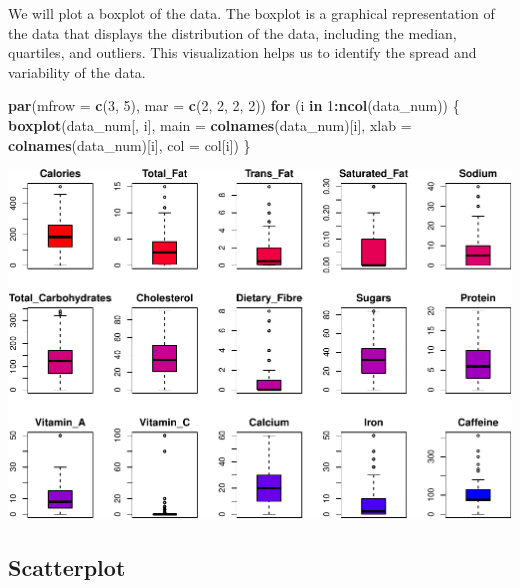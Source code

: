 \documentclass[
]{article}
\newenvironment{Shaded}{\begin{snugshade}}{\end{snugshade}}
\newcommand{\AttributeTok}[1]{\textcolor[rgb]{0.13,0.29,0.53}{#1}}
\newcommand{\ControlFlowTok}[1]{\textcolor[rgb]{0.13,0.29,0.53}{\textbf{#1}}}
\newcommand{\DecValTok}[1]{\textcolor[rgb]{0.00,0.00,0.81}{#1}}
\newcommand{\FunctionTok}[1]{\textcolor[rgb]{0.13,0.29,0.53}{\textbf{#1}}}
\newcommand{\NormalTok}[1]{#1}
\newcommand{\SpecialCharTok}[1]{\textcolor[rgb]{0.81,0.36,0.00}{\textbf{#1}}}
\begin{document}
We will plot a boxplot of the data. The boxplot is a graphical
representation of the data that displays the distribution of the data,
including the median, quartiles, and outliers. This visualization helps
us to identify the spread and variability of the data.

\begin{Shaded}
\begin{Highlighting}[]
\FunctionTok{par}\NormalTok{(}\AttributeTok{mfrow =} \FunctionTok{c}\NormalTok{(}\DecValTok{3}\NormalTok{, }\DecValTok{5}\NormalTok{), }\AttributeTok{mar =} \FunctionTok{c}\NormalTok{(}\DecValTok{2}\NormalTok{, }\DecValTok{2}\NormalTok{, }\DecValTok{2}\NormalTok{, }\DecValTok{2}\NormalTok{))}
\ControlFlowTok{for}\NormalTok{ (i }\ControlFlowTok{in} \DecValTok{1}\SpecialCharTok{:}\FunctionTok{ncol}\NormalTok{(data\_num)) \{}
  \FunctionTok{boxplot}\NormalTok{(data\_num[, i], }\AttributeTok{main =} \FunctionTok{colnames}\NormalTok{(data\_num)[i],}
          \AttributeTok{xlab =} \FunctionTok{colnames}\NormalTok{(data\_num)[i], }\AttributeTok{col =}\NormalTok{ col[i])}
\NormalTok{\}}
\end{Highlighting}
\end{Shaded}

\begin{center}\includegraphics{Statistical_Learning_Final_Report_files/figure-latex/boxplot-1} \end{center}

\subsection{Scatterplot}\label{scatterplot}
\end{document}
